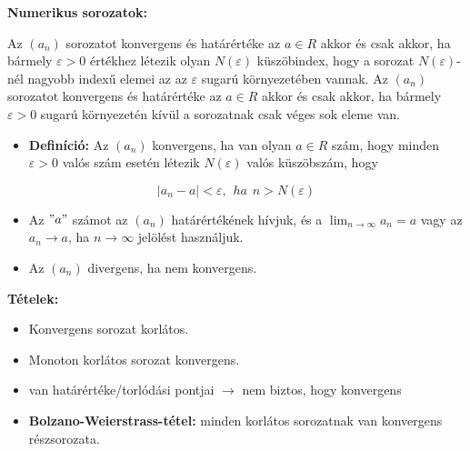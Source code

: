 \documentclass[11pt,a4paper]{article}
\begin{document}
\textbf{Numerikus sorozatok:}

\begin{tcolorbox}[colback=green!5!white,colframe=green!60!black,title= 1. Numerikus sorozat határértéke]
Az \((a_n)\) sorozatot konvergens és határértéke az \(a \in R\) akkor és csak akkor, ha bármely \(\varepsilon > 0\) értékhez
létezik olyan \(N(\varepsilon)\) küszöbindex, hogy a sorozat \(N(\varepsilon)\)-nél nagyobb indexű elemei az az \(\varepsilon\) sugarú környezetében vannak.
Az \((a_n)\) sorozatot konvergens és határértéke az \(a \in R\) akkor és csak akkor, ha bármely \(\varepsilon > 0\) sugarú
környezetén kívül a sorozatnak csak véges sok eleme van.
\end{tcolorbox}

\begin{tcolorbox}[colback=green!5!white,colframe=green!60!black,title= 2. Konvergens{,} divergens sorozat]
    \begin{itemize}
        \item \textbf{Definíció:} Az \((a_n)\) konvergens, ha van olyan \(a \in R\) szám, hogy minden \(\varepsilon > 0\) valós szám esetén létezik \(N(\varepsilon)\) valós küszöbszám, hogy
    \end{itemize}
        $$\left\lvert a_n -a\right\rvert < \varepsilon,\hspace{5pt}ha\hspace{5pt}n > N(\varepsilon)$$
    \begin{itemize}
        \item Az \("a"\) számot az \((a_n)\) határértékének hívjuk, és a \(\lim_{n \to \infty} a_n = a\)  vagy az \(a_n \to a\), ha \(n \to \infty \) jelölést használjuk.
        \item Az \((a_n)\) divergens, ha nem konvergens.
    \end{itemize}
\textbf{Tételek:}
\begin{itemize}
    \item Konvergens sorozat korlátos.
    \item Monoton korlátos sorozat konvergens.
    \item van határértéke/torlódási pontjai \(\rightarrow\) nem biztos, hogy konvergens
    \item \textbf{Bolzano-Weierstrass-tétel:} minden korlátos sorozatnak van konvergens részsorozata.
\end{itemize}
\end{tcolorbox}
\end{document}
